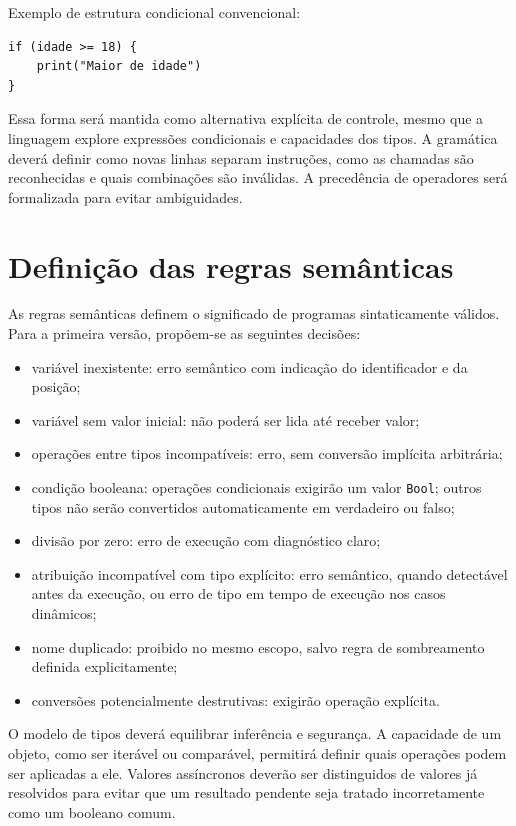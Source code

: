 \documentclass[12pt,a4paper]{article}
\begin{document}
Exemplo de estrutura condicional convencional:

\begin{lstlisting}
if (idade >= 18) {
    print("Maior de idade")
}
\end{lstlisting}

Essa forma será mantida como alternativa explícita de controle, mesmo que a linguagem explore expressões condicionais e capacidades dos tipos. A gramática deverá definir como novas linhas separam instruções, como as chamadas são reconhecidas e quais combinações são inválidas. A precedência de operadores será formalizada para evitar ambiguidades.

\section{Definição das regras semânticas}
As regras semânticas definem o significado de programas sintaticamente válidos. Para a primeira versão, propõem-se as seguintes decisões:
\begin{itemize}
\item variável inexistente: erro semântico com indicação do identificador e da posição;
\item variável sem valor inicial: não poderá ser lida até receber valor;
\item operações entre tipos incompatíveis: erro, sem conversão implícita arbitrária;
\item condição booleana: operações condicionais exigirão um valor \texttt{Bool}; outros tipos não serão convertidos automaticamente em verdadeiro ou falso;
\item divisão por zero: erro de execução com diagnóstico claro;
\item atribuição incompatível com tipo explícito: erro semântico, quando detectável antes da execução, ou erro de tipo em tempo de execução nos casos dinâmicos;
\item nome duplicado: proibido no mesmo escopo, salvo regra de sombreamento definida explicitamente;
\item conversões potencialmente destrutivas: exigirão operação explícita.
\end{itemize}

O modelo de tipos deverá equilibrar inferência e segurança. A capacidade de um objeto, como ser iterável ou comparável, permitirá definir quais operações podem ser aplicadas a ele. Valores assíncronos deverão ser distinguidos de valores já resolvidos para evitar que um resultado pendente seja tratado incorretamente como um booleano comum.
\end{document}
